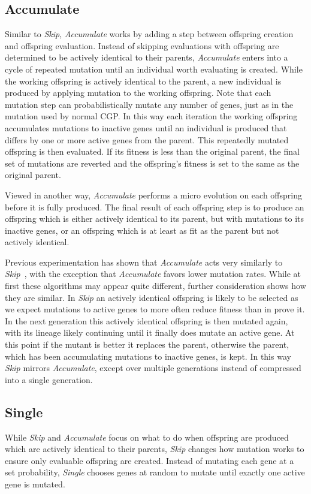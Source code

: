 \documentclass[journal]{IEEEtran}
\begin{document}
\subsection{Accumulate}
Similar to \emph{Skip}, \emph{Accumulate} works by adding a step between offspring
creation and offspring evaluation.  Instead of skipping evaluations with offspring
are determined to be actively identical to their parents, \emph{Accumulate} enters
into a cycle of repeated mutation until an individual worth evaluating is created.
While the working offspring is actively identical to the
parent, a new individual is produced by applying mutation to the working offspring.
Note that each mutation step can probabilistically mutate any number of genes, just
as in the mutation used by normal CGP.
In this way each iteration the working offspring accumulates mutations to inactive
genes until an individual is produced that differs by one or more active genes from
the parent.  This repeatedly mutated offspring is then evaluated.  If its fitness
is less than the original parent, the final set of mutations are reverted
and the offspring's fitness is set to the same as the original parent.

Viewed in another way, \emph{Accumulate} performs a micro evolution on each offspring
before it is fully produced.  The final result of each offspring step is to produce
an offspring which is either actively identical to its parent, but with mutations
to its inactive genes, or an offspring which is at least as fit as the parent but
not actively identical.

Previous experimentation has shown that \emph{Accumulate} acts very similarly to
\emph{Skip}~\cite{goldman:2013:cgpwaste}, with the exception that \emph{Accumulate}
favors lower mutation rates. While at first these algorithms may appear
quite different, further consideration shows how they are similar.  In \emph{Skip}
an actively identical offspring is likely to be selected as we expect mutations to
active genes to more often reduce fitness than in prove it.  In the next generation
this actively identical offspring is then mutated again, with its lineage likely
continuing until it finally does mutate an active gene.  At this point if the
mutant is better it replaces the parent, otherwise the parent, which has been accumulating
mutations to inactive genes, is kept.  In this way \emph{Skip} mirrors \emph{Accumulate},
except over multiple generations instead of compressed into a single generation.

\subsection{Single}
While \emph{Skip} and \emph{Accumulate} focus on what to do when offspring are
produced which are actively identical to their parents, \emph{Skip} changes
how mutation works to ensure only evaluable offspring are created.  Instead
of mutating each gene at a set probability, \emph{Single} chooses genes at
random to mutate until exactly one active gene is mutated.
\end{document}
